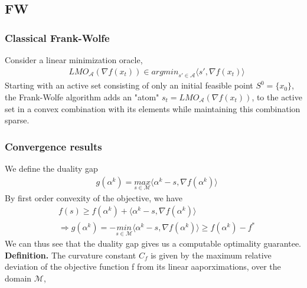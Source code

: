 \subsection*{FW}
\subsubsection*{Classical Frank-Wolfe}
Consider a linear minimization oracle,
\begin{equation*}
\begin{aligned}
    &LMO_{\mathcal{A}}(\nabla f(x_{t}))\in \textit{argmin}_{s\prime\in\mathcal{A}}\langle s\prime, \nabla f(x_{t})\rangle
\end{aligned}
\end{equation*}
Starting with an active set consisting of only an initial feasible point $S^{0}=
\{x_{0}\}$, the Frank-Wolfe algorithm adds an "atom" $s_{t}=
LMO_{\mathcal{A}}(\nabla f(x_{t}))$, to the active set in a convex combination
with its elements while maintaining this combination sparse.
\subsubsection*{Convergence results}
We define the duality gap
\begin{equation*}
\begin{aligned}
    &g(\alpha^{k})= \underset{s\in\mathcal{M}}{\textit{max}}\langle \alpha^{k}-s, \nabla f(\alpha^{k})\rangle
\end{aligned}
\end{equation*}
By first order convexity of the objective, we have
\begin{equation*}
\begin{aligned}
    &f(s)\geq f(\alpha^{k})+ \langle \alpha^{k}-s, \nabla f(\alpha^{k})\rangle\\
    &\Longrightarrow g(\alpha^{k})= -\underset{s\in\mathcal{M}}{\textit{min}}\langle \alpha^{k}-s, \nabla f(\alpha^{k})\rangle \geq f(\alpha^{k})- f^{*}
\end{aligned}
\end{equation*}
We can thus see that the duality gap gives us a computable optimality guarantee. \\

\textbf{Definition.} The curvature constant $C_{f}$ is given by the maximum relative deviation of the objective function f from its linear aaporximations, over the domain $\mathcal{M}$,


